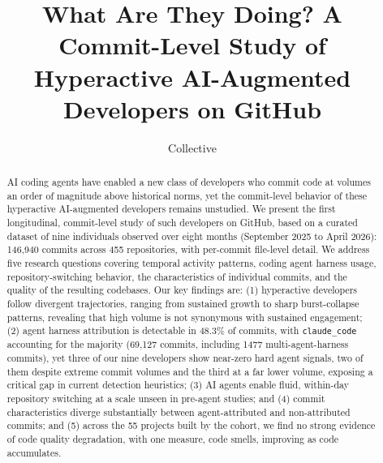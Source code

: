 \documentclass[smallextended]{svjour3}
\begin{document}
\title{What Are They Doing? A Commit-Level Study of Hyperactive AI-Augmented Developers on GitHub}

\author{Collective}

\institute{
}

\maketitle

\begin{abstract}
AI coding agents have enabled a new class of developers who commit code at volumes an order of magnitude above historical norms, yet the commit-level behavior of these hyperactive AI-augmented developers remains unstudied.
We present the first longitudinal, commit-level study of such developers on GitHub, based on a curated dataset of nine individuals observed over eight months (September 2025 to April 2026): 146,940 commits across 455 repositories, with per-commit file-level detail.
We address five research questions covering temporal activity patterns, coding agent harness usage, repository-switching behavior, the characteristics of individual commits, and the quality of the resulting codebases.
Our key findings are: (1) hyperactive developers follow divergent trajectories, ranging from sustained growth to sharp burst-collapse patterns, revealing that high volume is not synonymous with sustained engagement; (2) agent harness attribution is detectable in 48.3\% of commits, with \texttt{claude\_code} accounting for the majority (69,127 commits, including 1477 multi-agent-harness commits), yet three of our nine developers show near-zero hard agent signals, two of them despite extreme commit volumes and the third at a far lower volume, exposing a critical gap in current detection heuristics; (3) AI agents enable fluid, within-day repository switching at a scale unseen in pre-agent studies; and (4) commit characteristics diverge substantially between agent-attributed and non-attributed commits; and (5) across the 55 projects built by the cohort, we find no strong evidence of code quality degradation, with one measure, code smells, improving as code accumulates.
\end{abstract}

\end{document}
